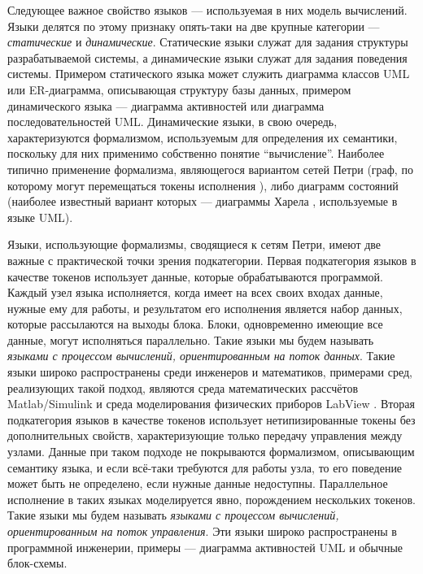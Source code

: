Следующее важное свойство языков --- используемая в них модель вычислений. Языки 
делятся по этому признаку опять-таки на две крупные категории --- \textit{статические} 
и \textit{динамические}. 
Статические языки служат для задания структуры разрабатываемой 
системы, а динамические языки служат для задания поведения системы. Примером 
статического языка может служить диаграмма классов UML или ER-диаграмма, 
описывающая структуру базы данных, примером динамического языка --- диаграмма 
активностей или диаграмма последовательностей UML. Динамические языки, в свою 
очередь, характеризуются формализмом, используемым для определения их семантики, 
поскольку для них применимо собственно понятие "`вычисление"'. Наиболее типично 
применение формализма, являющегося вариантом сетей Петри (граф, по которому 
могут перемещаться токены исполнения
), либо диаграмм состояний
(наиболее известный вариант которых --- диаграммы Харела 
, используемые в языке UML). 

Языки, использующие формализмы, сводящиеся к сетям Петри, имеют две важные с 
практической точки зрения подкатегории. Первая подкатегория языков в качестве 
токенов использует данные, которые обрабатываются программой. Каждый узел языка 
исполняется, когда имеет на всех своих входах данные, нужные ему для работы, 
и результатом его исполнения является набор данных, которые рассылаются на 
выходы блока. Блоки, одновременно имеющие все данные, могут исполняться 
параллельно. Такие языки мы будем называть \textit{языками с процессом вычислений, 
ориентированным на поток данных}. Такие языки широко распространены среди 
инженеров и математиков, примерами сред, реализующих такой подход, являются 
среда математических рассчётов Matlab/Simulink
 и среда моделирования физических 
приборов LabView
. Вторая подкатегория языков в качестве токенов использует 
нетипизированные токены без дополнительных свойств, характеризующие только 
передачу управления между узлами. Данные при таком подходе не покрываются 
формализмом, описывающим семантику языка, и если всё-таки требуются для работы 
узла, то его поведение может быть не определено, если нужные данные недоступны. 
Параллельное исполнение в таких языках моделируется явно, порождением нескольких 
токенов. Такие языки мы будем называть \textit{языками с процессом вычислений, 
ориентированным на поток управления}. Эти языки широко распространены в 
программной инженерии, примеры --- диаграмма активностей UML и обычные 
блок-схемы.

